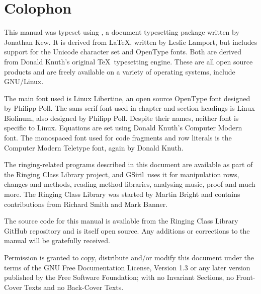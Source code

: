 \documentclass[a4paper,11pt,oneside]{book}
\def\gsiril{GSiril}
\begin{document}
\clearpage
{}
\footnotesize
{}

\normalsize
\chapter*{Colophon}

This manual was typeset using \XeTeX{}, a document 
typesetting package written by Jonathan Kew.  It is derived from 
\LaTeX, written by Leslie Lamport, but includes support for the Unicode 
character set and OpenType fonts.
Both are derived from Donald Knuth's original \TeX\ typesetting engine.  
These are all open source products and are freely available on a variety of 
operating systems, include GNU/Linux. 

The main font used is Linux Libertine, an open source OpenType font designed
by Philipp Poll.  The sans serif font used in chapter and section headings
is Linux Biolinum, also designed by Philipp Poll.  Despite their names,
neither font is specific to Linux.  Equations are set using Donald Knuth's 
Computer Modern font.  The monospaced font used for code fragments and
row literals is the Computer Modern Teletype font, again by Donald Knuth.%

The ringing-related programs described in this document are available as
part of the Ringing Class Library project,
and \gsiril\ uses it for manipulation rows, changes and methods, 
reading method libraries, analysing music, proof and much more.  
The Ringing Class Library was started by Martin Bright 
and contains contributions from Richard Smith and Mark Banner.

The source code for this manual is available from the Ringing Class Library
GitHub repository and is itself open source.  Any additions or
corrections to the manual will be gratefully received.

\vfil
\footnotesize
Permission is granted to copy, distribute and/or modify this
document under the terms of the GNU Free Documentation License,
Version 1.3 or any later version published by the Free Software
Foundation; with no Invariant Sections, no Front-Cover Texts and
no Back-Cover Texts.
\end{document}
